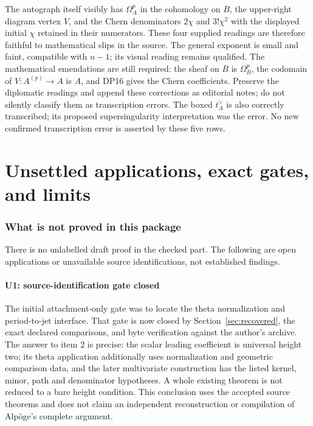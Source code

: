 \documentclass[11pt,a4paper]{article}
\theoremstyle{definition}\newtheorem{remark}[theorem]{Remark}
\begin{document}
The autograph itself visibly has $\Omega_A^p$ in the cohomology on $B$, the upper-right diagram vertex $V$, and the Chern denominators $2\chi$ and $3!\chi^2$ with the displayed initial $\chi$ retained in their numerators. These four supplied readings are therefore faithful to mathematical slips in the source. The general exponent is small and faint, compatible with $n-1$; its visual reading remains qualified. The mathematical emendations are still required: the sheaf on $B$ is $\Omega_B^p$, the codomain of $V:A^{(p)}\to A$ is $A$, and DP16 gives the Chern coefficients. Preserve the diplomatic readings and append these corrections as editorial notes; do not silently classify them as transcription errors. The boxed $t_A^\vee$ is also correctly transcribed; its proposed supersingularity interpretation was the error. No new confirmed transcription error is asserted by these five rows.

\part{Unsettled applications, exact gates, and limits}

\section{What is not proved in this package}

There is no unlabelled draft proof in the checked part. The following are open applications or unavailable source identifications, not established findings.

\subsection{U1: source-identification gate closed}

The initial attachment-only gate was to locate the theta normalization and period-to-jet interface. That gate is now closed by Section~\ref{sec:recovered}, the exact declared comparisons, and byte verification against the author's archive. The answer to item 2 is precise: the scalar leading coefficient is universal height two; its theta application additionally uses normalization and geometric comparison data, and the later multivariate construction has the listed kernel, minor, path and denominator hypotheses. A whole existing theorem is not reduced to a bare height condition. This conclusion uses the accepted source theorems and does not claim an independent reconstruction or compilation of Alp\"oge's complete argument.
\end{document}
